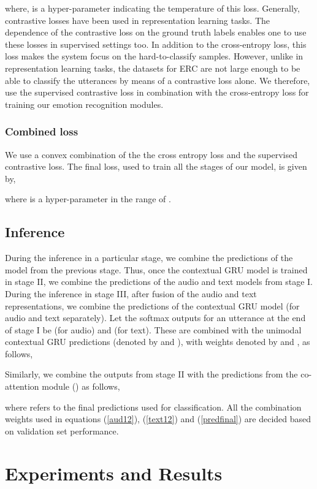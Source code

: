 \documentclass[lettersize,journal]{IEEEtran}
\begin{document}
where,  is a hyper-parameter indicating the temperature of this loss.
Generally, contrastive losses have been used in representation learning tasks. The dependence of the contrastive loss on the ground truth labels enables one to use these losses in supervised settings too. In addition to the cross-entropy loss, this loss makes the system focus on the hard-to-classify samples. However, unlike in representation learning tasks, the datasets for ERC are not large enough to be able to classify the utterances by means of a contrastive loss alone. We therefore, use the supervised contrastive loss in combination with the cross-entropy loss for training our emotion recognition modules.


\subsubsection{Combined loss}
We use a convex combination of the the cross entropy loss and the supervised contrastive loss. The final loss, used to train all the stages of our model, is given by,

where  is a hyper-parameter in the range of .
\subsection{Inference}\label{inference}
During the inference in a particular stage, we combine the predictions of the model from the previous stage. Thus, once the contextual GRU model is trained in stage II, we combine the predictions of the audio and text models from stage I. During the inference in stage III, after fusion of the audio and text representations, we combine the predictions of the contextual GRU model (for audio and text separately). Let the softmax outputs for an utterance  at the end of stage I be  (for audio) and  (for text). These are combined with the unimodal contextual GRU predictions (denoted by  and ), with weights denoted by  and , as follows,

Similarly, we combine the outputs from stage II with the predictions from the co-attention module () as follows,


where  refers to the  final predictions used for  classification. All the combination weights used in equations (\ref{aud12}), (\ref{text12}) and (\ref{predfinal}) are decided based on validation set performance.
\section{Experiments and Results}\label{experiments}
\end{document}
